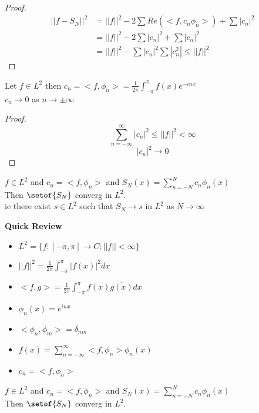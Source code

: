 \documentclass[answers,12pt,addpoints]{exam}
\begin{document}
\begin{theorem}
\begin{theorem}
\begin{proof}
            \begin{align*}
                ||f - S_N||^2 &= ||f||^2 - 2 \sum Re(<f, c_n \phi_n>) + \sum |c_n|^2\\
                &= ||f||^2 - 2 \sum |c_n|^2 + \sum |c_n|^2\\
                &= ||f||^2 - \sum |c_n|^2
                \sum |c_n^2| \leq ||f||^2
            \end{align*}
        \end{proof}
    \end{theorem}
    \begin{corollary}
        Let $f \in L^2$ then $c_n = <f, \phi_n> = \frac{1}{2\pi} \int_{-\pi}^{\pi} f(x) e^{-inx}$\\
        $c_n \to 0$ as $n \to \pm \infty$ 
        \begin{proof}
            $$\sum_{n=-\infty}^{\infty} |c_n|^2 \leq ||f||^2 < \infty$$
            $$|c_n|^2 \to 0$$
        \end{proof}
    \end{corollary}
    \begin{theorem}
        $f\in L^2$ and $c_n = <f, \phi_n>$ and $S_N(x) = \sum_{n=-N}^{N} c_n \phi_n(x)$\\
        Then $\setof{S_N}$ converg in $L^2$.\\
        ie there exist $s \in L^2$ such that $S_N \to s$ in $L^2$ as $N \to \infty$
    \end{theorem}
    \textbf{Quick Review}
    \begin{itemize}
        \item $L^2 = \{ f: [-\pi, \pi] \to C: ||f|| < \infty\}$
        \item $||f||^2 = \frac{1}{2\pi} \int_{-\pi}^{\pi} |f(x)|^2 dx$
        \item $<f,g> = \frac{1}{2\pi} \int_{-\pi}^{\pi} f(x) \overline{g(x)} dx$
        \item $\phi_n(x) = e^{inx}$
        \item $<\phi_n, \phi_m> = \delta_{nm}$
        \item $f(x) = \sum_{n=-\infty}^{\infty} <f, \phi_n> \phi_n(x)$
        \item $c_n = <f, \phi_n>$
    \end{itemize}
    \begin{theorem}
        $f\in L^2$ and $c_n = <f, \phi_n>$ and $S_N(x) = \sum_{n=-N}^{N} c_n \phi_n(x)$\\
        Then $\setof{S_N}$ converg in $L^2$.\\

\end{theorem}
\end{theorem}
\end{document}
